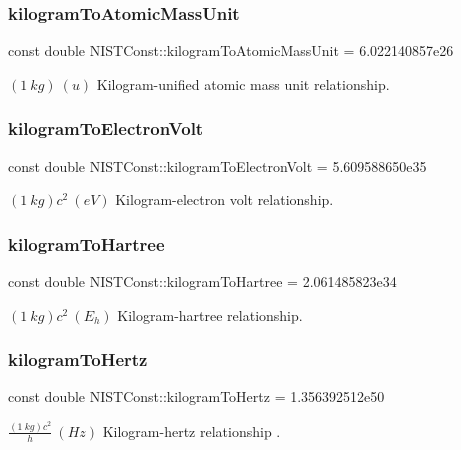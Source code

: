 \subsubsection{\texorpdfstring{kilogram\+To\+Atomic\+Mass\+Unit}{kilogramToAtomicMassUnit}}
{\footnotesize\ttfamily const double N\+I\+S\+T\+Const\+::kilogram\+To\+Atomic\+Mass\+Unit = 6.\+022140857e26}

$(1\ kg)\ (u)$ Kilogram-\/unified atomic mass unit relationship. \mbox{\label{group___kilogram_gae0d25d28f6a0596f2dd5f8b3dc5ebb38}} 
\subsubsection{\texorpdfstring{kilogram\+To\+Electron\+Volt}{kilogramToElectronVolt}}
{\footnotesize\ttfamily const double N\+I\+S\+T\+Const\+::kilogram\+To\+Electron\+Volt = 5.\+609588650e35}

$(1\ kg)c^2 \ (eV)$ Kilogram-\/electron volt relationship. \mbox{\label{group___kilogram_gaa1f73e0db10cccf2a4c86dbd360e49a8}} 
\subsubsection{\texorpdfstring{kilogram\+To\+Hartree}{kilogramToHartree}}
{\footnotesize\ttfamily const double N\+I\+S\+T\+Const\+::kilogram\+To\+Hartree = 2.\+061485823e34}

$(1\ kg)c^2 \ (E_h)$ Kilogram-\/hartree relationship. \mbox{\label{group___kilogram_gaf543ce948a71df1884a8f240106c3c33}} 
\subsubsection{\texorpdfstring{kilogram\+To\+Hertz}{kilogramToHertz}}
{\footnotesize\ttfamily const double N\+I\+S\+T\+Const\+::kilogram\+To\+Hertz = 1.\+356392512e50}

$\frac{(1\ kg)c^2}{h} \ (Hz)$ Kilogram-\/hertz relationship . \mbox{\label{group___kilogram_gaeb262618c1568d210f8a5a8fdca39ae2}} 
